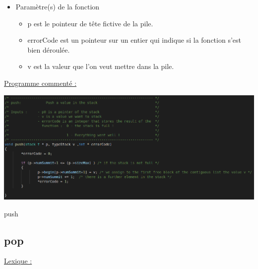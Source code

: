 \documentclass[a4paper]{article}
\begin{document}
\begin{itemize}

\item Paramètre(s) de la fonction  

\begin{itemize}

\item p est le pointeur de tête fictive de la pile.

\item errorCode est un pointeur sur un entier qui indique si la fonction s'est bien déroulée.

\item v est la valeur que l'on veut mettre dans la pile.

\end{itemize}


\end{itemize}

\underline{Programme commenté :}
\begin{center}
\includegraphics[scale=0.4]{push.png}

push
\end{center}
\subsection{pop}
\underline{Lexique :}
\end{document}
